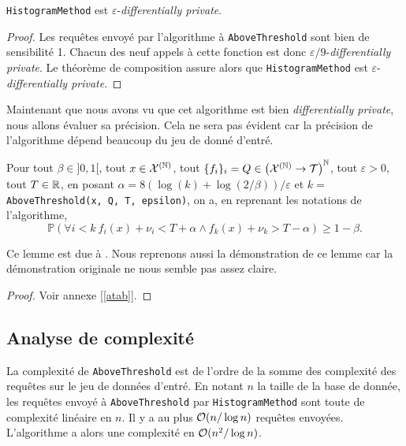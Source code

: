 \begin{theorem}
    \texttt{HistogramMethod} est \(\varepsilon\)-\textit{differentially private}.
\end{theorem}

\begin{proof}
    Les requêtes envoyé par l'algorithme à \texttt{AboveThreshold} sont bien de sensibilité 1. Chacun des neuf appels à cette fonction est donc \(\varepsilon/9\)-\textit{differentially private}. Le théorème de composition assure alors que \texttt{HistogramMethod} est \(\varepsilon\)-\textit{differentially private}.
\end{proof}

Maintenant que nous avons vu que cet algorithme est bien \textit{differentially private}, nous allons évaluer sa précision. Cela ne sera pas évident car la précision de l'algorithme dépend beaucoup du jeu de donné d'entré.

\begin{lemma}\label{ATalphabeta}
    Pour tout \(\beta \in ]0,1[\), tout \(x \in \mathcal X^{(\mathbb{N})}\), tout \(\{f_i\}_i = Q \in \left( \mathcal X^{(\mathbb{N})} \to  \mathcal T \right)^{\mathbb{N}}\), tout \(\varepsilon > 0\), tout \(T \in \mathbb{R}\),  en posant \(\alpha = 8\left( \log(k) + \log(2/\beta) \right)/\varepsilon\) et \(k = \) \texttt{AboveThreshold(x, Q, T, epsilon)}, on a, en reprenant les notations de l'algorithme,
    \[
        \mathbb P \left( \forall i < k \  f_i(x) + \nu_i < T + \alpha \wedge f_k(x) + \nu_k > T - \alpha \right) \geq 1 - \beta.
    \]
\end{lemma}

\begin{remark}
    Ce lemme est due à \cite[page 61]{dwork2014the}. Nous reprenons aussi la démonstration de ce lemme car la démonstration originale ne nous semble pas assez claire.
\end{remark}

\begin{proof}
    Voir annexe [\ref{atab}].
\end{proof}

\subsection{Analyse de complexité}

La complexité de \texttt{AboveThreshold} est de l'ordre de la somme des complexité des requêtes sur le jeu de données d'entré. En notant \(n\) la taille de la base de donnée, les requêtes envoyé à \texttt{AboveThreshold} par \texttt{HistogramMethod} sont toute de complexité linéaire en \(n\). Il y a au plus \(\mathcal{O}(n/\log n)\) requêtes envoyées. L'algorithme a alors une complexité en \(\mathcal{O}(n^2/\log n)\).

